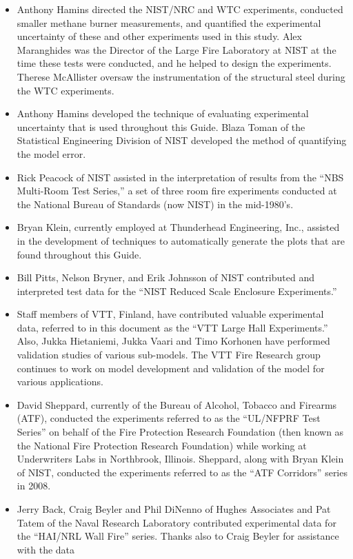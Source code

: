 \documentclass[11pt]{book}
\begin{document}
\begin{itemize}
\item Anthony Hamins directed the NIST/NRC and WTC experiments, conducted smaller methane burner
measurements, and quantified the experimental uncertainty of these and other
experiments used in this study. Alex Maranghides was the Director of the Large Fire Laboratory at NIST at
the time these tests were conducted, and he helped to design the
experiments. Therese McAllister oversaw the instrumentation of the structural steel during the WTC experiments.
\item Anthony Hamins developed the technique of evaluating experimental uncertainty that is used throughout this Guide.
Blaza Toman of the Statistical Engineering Division of NIST developed the method of quantifying the
model error.
\item Rick Peacock of NIST assisted in the interpretation of results from
the ``NBS Multi-Room Test Series,'' a set of three room
fire experiments conducted at the National Bureau of Standards (now
NIST) in the mid-1980's.
\item Bryan Klein, currently employed at Thunderhead Engineering, Inc., assisted in the development of techniques to automatically generate the plots that
are found throughout this Guide.
\item Bill Pitts, Nelson Bryner, and Erik Johnsson of NIST contributed and interpreted test data for the
``NIST Reduced Scale Enclosure Experiments.''
\item Staff members of VTT, Finland, have contributed valuable experimental data,
referred to in this document as the ``VTT Large Hall Experiments.''
Also, Jukka Hietaniemi, Jukka Vaari and Timo Korhonen have
performed validation studies of various sub-models. The VTT Fire
Research group continues to work on model development and
validation of the model for various applications.
\item David Sheppard, currently of the Bureau of Alcohol, Tobacco and Firearms (ATF), conducted the
experiments referred to as the ``UL/NFPRF Test Series'' on behalf of the Fire Protection Research Foundation (then known as
the National Fire Protection Research Foundation) while working at Underwriters Labs in Northbrook, Illinois.
Sheppard, along with Bryan Klein of NIST, conducted the experiments referred to as the ``ATF Corridors'' series in 2008.
\item Jerry Back, Craig Beyler and Phil DiNenno of Hughes Associates and Pat Tatem of
the Naval Research Laboratory contributed
experimental data for the ``HAI/NRL Wall Fire'' series. Thanks also to Craig Beyler for assistance with the data

\end{itemize}
\end{document}
